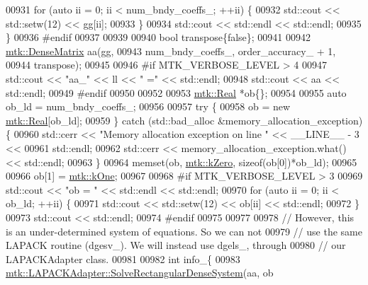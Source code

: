 \begin{DoxyCode}
{{00931       \textcolor{keywordflow}{for} (\textcolor{keyword}{auto} ii = 0; ii < num\_bndy\_coeffs\_; ++ii) \{
00932         std::cout << std::setw(12) << gg[ii];
00933       \}
00934       std::cout << std::endl << std::endl;
00935     \}
00936 \textcolor{preprocessor}{    #endif}
00937 
00939 
00940     \textcolor{keywordtype}{bool} transpose\{\textcolor{keyword}{false}\};
00941 
00942     \hyperlink{classmtk_1_1DenseMatrix}{mtk::DenseMatrix} aa(gg,
00943                          num\_bndy\_coeffs\_, order\_accuracy\_ + 1,
00944                          transpose);
00945 
00946 \textcolor{preprocessor}{    #if MTK\_VERBOSE\_LEVEL > 4}
00947     std::cout << \textcolor{stringliteral}{"aa\_"} << ll << \textcolor{stringliteral}{" ="} << std::endl;
00948     std::cout << aa << std::endl;
00949 \textcolor{preprocessor}{    #endif}
00950 
00952 
00953     \hyperlink{group__c01-roots_gac080bbbf5cbb5502c9f00405f894857d}{mtk::Real} *ob\{\};
00954 
00955     \textcolor{keyword}{auto} ob\_ld = num\_bndy\_coeffs\_;
00956 
00957     \textcolor{keywordflow}{try} \{
00958       ob = \textcolor{keyword}{new} \hyperlink{group__c01-roots_gac080bbbf5cbb5502c9f00405f894857d}{mtk::Real}[ob\_ld];
00959     \} \textcolor{keywordflow}{catch} (std::bad\_alloc &memory\_allocation\_exception) \{
00960       std::cerr << \textcolor{stringliteral}{"Memory allocation exception on line "} << \_\_LINE\_\_ - 3 <<
00961         std::endl;
00962       std::cerr << memory\_allocation\_exception.what() << std::endl;
00963     \}
00964     memset(ob, \hyperlink{group__c01-roots_ga59a451a5fae30d59649bcda274fea271}{mtk::kZero}, \textcolor{keyword}{sizeof}(ob[0])*ob\_ld);
00965 
00966     ob[1] = \hyperlink{group__c01-roots_ga26407c24d43b6b95480943340d285c71}{mtk::kOne};
00967 
00968 \textcolor{preprocessor}{    #if MTK\_VERBOSE\_LEVEL > 3}
00969     std::cout << \textcolor{stringliteral}{"ob = "} << std::endl << std::endl;
00970     \textcolor{keywordflow}{for} (\textcolor{keyword}{auto} ii = 0; ii < ob\_ld; ++ii) \{
00971       std::cout << std::setw(12) << ob[ii] << std::endl;
00972     \}
00973     std::cout << std::endl;
00974 \textcolor{preprocessor}{    #endif}
00975 
00977 
00978     \textcolor{comment}{// However, this is an under-determined system of equations. So we can not}
00979     \textcolor{comment}{// use the same LAPACK routine (dgesv\_). We will instead use dgels\_, through}
00980     \textcolor{comment}{// our LAPACKAdapter class.}
00981 
00982     \textcolor{keywordtype}{int} info\_\{
00983       \hyperlink{classmtk_1_1LAPACKAdapter_a380f148ffdf96bae2f79ae28f1a6560c}{mtk::LAPACKAdapter::SolveRectangularDenseSystem}(aa, ob
}}
\end{DoxyCode}

